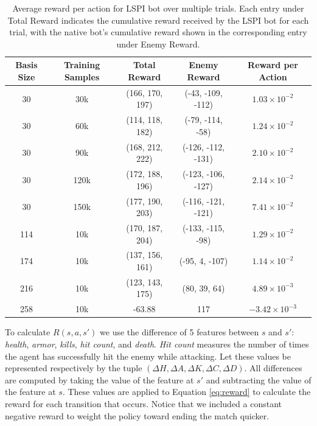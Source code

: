 \begin{table}%
    \centering
    \begin{tabular}{|c|c|c|c|c|}
        \hline
        Basis Size & Training Samples & Total Reward & Enemy Reward & Reward per Action \\ \hline
        \hline 
        30 & 30k & (166, 170, 197) & (-43, -109, -112) & $1.03 \times 10^{-2}$ \\ \hline
        30 & 60k & (114, 118, 182) & (-79, -114, -58) & $1.24 \times 10^{-2}$ \\ \hline
        30 & 90k & (168, 212, 222) & (-126, -112, -131) & $2.10 \times 10^{-2}$ \\ \hline
        30 & 120k & (172, 188, 196) & (-123, -106, -127) & $2.14 \times 10^{-2}$ \\ \hline
        30 & 150k & (177, 190, 203) & (-116, -121, -121) & $7.41 \times 10^{-2}$ \\ \hline
        114 & 10k & (170, 187, 204) & (-133, -115, -98) & $1.29 \times 10^{-2}$ \\ \hline
        174 & 10k & (137, 156, 161) & (-95, 4, -107) & $1.14 \times 10^{-2}$ \\ \hline
        216 & 10k & (123, 143, 175) & (80, 39, 64) & $4.89 \times 10^{-3}$ \\ \hline
        258 & 10k & -63.88 & 117 & $-3.42 \times 10^{-3}$ \\
        \hline
    \end{tabular}
\caption{Average reward per action for LSPI bot over multiple trials. Each entry under Total Reward indicates the cumulative reward received by the LSPI bot for each trial, with the native bot's cumulative reward shown in the corresponding entry under Enemy Reward.}
\label{tab:reward}
\end{table}

To calculate $R(s,a,s')$ we use the difference of 5 features between $s$ and $s'$: \emph{health}, \emph{armor}, \emph{kills}, \emph{hit count}, and \emph{death}. \emph{Hit count} measures the number of times the agent has successfully hit the enemy while attacking. Let these values be represented respectively by the tuple $(\Delta H, \Delta A, \Delta K, \Delta C, \Delta D)$. All differences are computed by taking the value of the feature at $s'$ and subtracting the value of the feature at $s$. These values are applied to Equation \ref{eq:reward} to calculate the reward for each transition that occurs.  Notice that we included a constant negative reward to weight the policy toward ending the match quicker.

